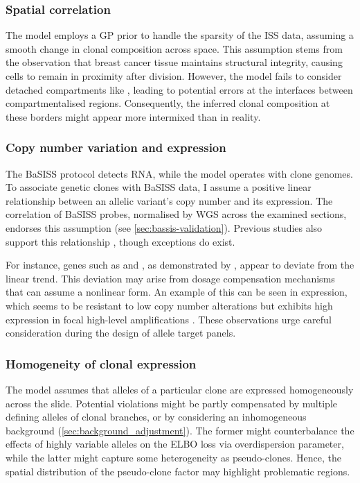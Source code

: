 \subsubsection*{Spatial correlation}
The model employs a \ac{GP} prior to handle the sparsity of the \ac{ISS} data, assuming a smooth change in clonal composition across space. This assumption stems from the observation that breast cancer tissue maintains structural integrity, causing cells to remain in proximity after division. However, the model fails to consider detached compartments like , leading to potential errors at the interfaces between compartmentalised regions. Consequently, the inferred clonal composition at these borders might appear more intermixed than in reality. 

\subsubsection*{Copy number variation and expression}
The \ac{BaSISS} protocol detects RNA, while the model operates with clone genomes. To associate genetic clones with \ac{BaSISS} data, I assume a positive linear relationship between an allelic variant's copy number and its expression. The correlation of \ac{BaSISS} probes, normalised by \ac{WGS} across the examined sections, endorses this assumption (see \cref{sec:bassis-validation}). Previous studies also support this relationship \parencite{Handsaker2015-jx}, though exceptions do exist.

For instance, genes such as  and , as demonstrated by \textcite{Shao2019-vq}, appear to deviate from the linear trend. This deviation may arise from dosage compensation mechanisms that can assume a nonlinear form. An example of this can be seen in  expression, which seems to be resistant to low copy number alterations but exhibits high expression in focal high-level amplifications \parencite{Schukken2022-jm}. These observations urge careful consideration during the design of allele target panels.

\subsubsection*{Homogeneity of clonal expression}
The model assumes that alleles of a particular clone are expressed homogeneously across the slide. Potential violations might be partly compensated by multiple defining alleles of clonal branches, or by considering an inhomogeneous background (\cref{sec:background_adjustment}). The former might counterbalance the effects of highly variable alleles on the \ac{ELBO} loss via overdispersion parameter, while the latter might capture some heterogeneity as pseudo-clones. Hence, the spatial distribution of the pseudo-clone factor may highlight problematic regions. 

